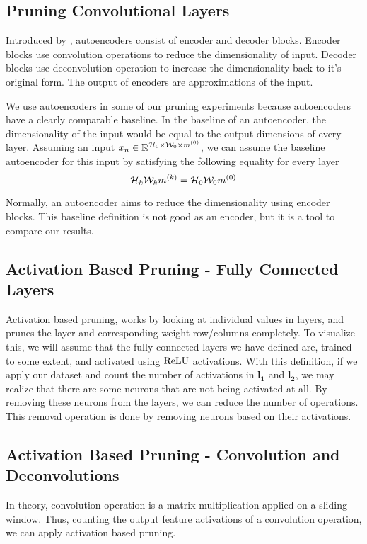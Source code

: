 \subsection{Pruning Convolutional Layers}
Introduced by \cite{hinton2006reducing}, autoencoders consist of encoder and decoder blocks. Encoder blocks use convolution operations to reduce the dimensionality of input. Decoder blocks use deconvolution operation to increase the dimensionality back to it's original form. The output of encoders are approximations of the input. 

We use autoencoders in some of our pruning experiments because autoencoders have a clearly comparable baseline. In the baseline of an autoencoder, the dimensionality of the input would be equal to the output dimensions of every layer. Assuming an input $x_{n} \in \mathbb{R}^{ \mathcal{H}_{0} \times \mathcal{W}_{0} \times m^{(0)}}$, we can assume the baseline autoencoder for this input by satisfying the following equality for every layer
$$ \mathcal{H}_{k}  \mathcal{W}_{k} m^{(k)} = \mathcal{H}_{0} \mathcal{W}_{0}  m^{(0)} $$

Normally, an autoencoder aims to reduce the dimensionality using encoder blocks. This baseline definition is not good as an encoder, but it is a tool to compare our results.



\iffalse
\subsection{Activation Based Pruning - Fully Connected Layers} \label{sec:activation-based-pruning-convolution}
Activation based pruning, works by looking at individual values in layers, and prunes the layer and corresponding weight row/columns completely. To visualize this, we will assume that the fully connected layers we have defined are, trained to some extent, and activated using $\textrm{ReLU}$ activations. With this definition, if we apply our dataset and count the number of activations in $\mathbf{l_1}$ and $\mathbf{l_2}$, we may realize that there are some neurons that are not being activated at all. By removing these neurons from the layers, we can reduce the number of operations. This removal operation is done by removing neurons based on their activations. 

\subsection{Activation Based Pruning - Convolution and Deconvolutions}
In theory, convolution operation is a matrix multiplication applied on a sliding window. Thus, counting the output feature activations of a convolution operation, we can apply activation based pruning. 

